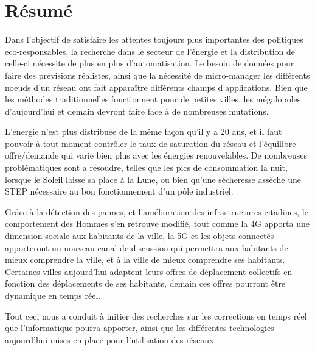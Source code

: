 \chapter*{Résumé}

Dans l'objectif de satisfaire les attentes toujours plus importantes des politiques eco-responsables,
la recherche dans le secteur de l'énergie et la distribution de celle-ci nécessite de plus en plus d'automatisation.
Le besoin de données pour faire des prévisions réalistes, ainsi que la nécessité de micro-manager les différents noeuds
d'un réseau ont fait apparaître différents champs d'applications. Bien que les méthodes traditionnelles fonctionnent
pour de petites villes, les mégalopoles d'aujourd'hui et demain devront faire face à de nombreuses mutations.

L'énergie n'est plus distribuée de la même façon qu'il y a 20 ans, et il faut pouvoir à tout moment contrôler
le taux de saturation du réseau et l'équilibre offre/demande qui varie bien plus avec les énergies renouvelables.
De nombreuses problématiques sont a résoudre, telles que les pics de consommation la nuit, lorsque le Soleil laisse sa place
à la Lune, ou bien qu'une sécheresse assèche une STEP nécessaire au bon fonctionnement d'un pôle industriel.

Grâce à la détection des pannes, et l'amélioration des infrastructures citadines, le comportement des Hommes
s'en retrouve modifié, tout comme la 4G apporta une dimension sociale aux habitants de la ville, la 5G et les objets
connectés apporteront un nouveau canal de discussion qui permettra aux habitants de mieux comprendre la ville, et
à la ville de mieux comprendre ses habitants. Certaines villes aujourd'hui adaptent leurs offres de déplacement
collectifs en fonction des déplacements de ses habitants, demain ces offres pourront être dynamique en temps réel.

Tout ceci nous a conduit à initier des recherches sur les corrections en temps réel que l'informatique pourra
apporter, ainsi que les différentes technologies aujourd'hui mises en place pour l'utilisation des réseaux.